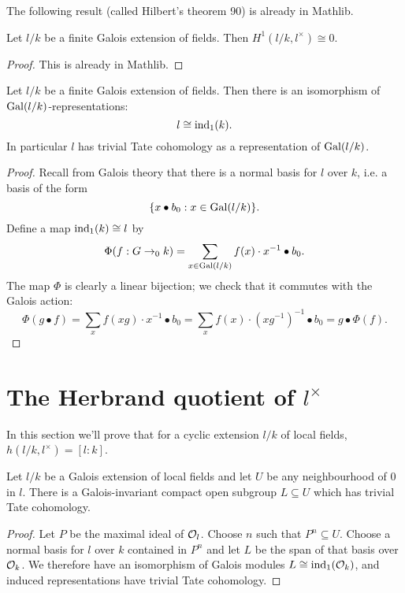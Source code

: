 The following result (called Hilbert's theorem 90) is already in Mathlib.

\begin{theorem}\label{thm:hilbert 90}
	\mathlibok
	Let $l/k$ be a finite Galois extension of fields.
	Then $H^1(l/k, l^\times) \cong 0$.
\end{theorem}

\begin{proof}
	\mathlibok
	This is already in Mathlib.
\end{proof}

\begin{theorem}\label{thm:additive field trivial}
	Let $l/k$ be a finite Galois extension of fields.
	Then there is an isomorphism of $\mathrm{Gal}(l/k)$-representations:
	\[
		l \cong \mathrm{ind}_1(k).
	\]
	In particular $l$ has trivial Tate cohomology as a representation of $\mathrm{Gal}(l/k)$.
\end{theorem}

\begin{proof}
	Recall from Galois theory that there is a normal basis for $l$ over $k$, i.e. a basis of the
	form
	\[
		\{x \bullet b_0 : x \in \mathrm{Gal}(l/k)\}.
	\]
	Define a map $\mathrm{ind}_1(k) \cong l$ by
	\[
		\Phi (f : G \to_0 k) = \sum_{x \in \mathrm{Gal}(l/k)} f(x) \cdot x^{-1} \bullet b_0.
	\]
	The map $\Phi$ is clearly a linear bijection;
	we check that it commutes with the Galois action:
	\[
		\Phi(g\bullet f)
		= \sum_x f(xg) \cdot x^{-1} \bullet b_0
		= \sum_x f(x) \cdot (xg^{-1})^{-1} \bullet b_0
		= g \bullet \Phi(f).
	\]
\end{proof}






\section{The Herbrand quotient of \texorpdfstring{$l^{\times}$}{l*}}

In this section we'll prove that for a cyclic extension $l/k$ of local fields,
$h(l/k,l^\times) = [l:k]$.

\begin{lemma}
	\label{lem:exists additive trivial}
	Let $l/k$ be a Galois extension of local fields and
	let $U$ be any neighbourhood of $0$ in $l$.
	There is a Galois-invariant compact open subgroup $L \subseteq U$
	which has trivial Tate cohomology.
\end{lemma}

\begin{proof}
	Let $P$ be the maximal ideal of ${\mathcal O}_l$.
	Choose $n$ such that $P^n \subseteq U$.
	Choose a normal basis for $l$ over $k$ contained in $P^n$
	and let $L$ be the span of that basis over ${\mathcal O}_k$.
	We therefore have an isomorphism of Galois modules $L \cong \mathrm{ind}_1({\mathcal O}_k)$,
	and induced representations have trivial Tate cohomology.
\end{proof}

